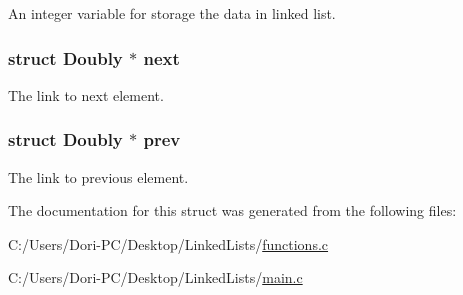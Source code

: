 An integer variable for storage the data in linked list. 

\subsubsection[{\texorpdfstring{next}{next}}]{\setlength{\rightskip}{0pt plus 5cm}struct {\bf Doubly} $\ast$ next}\hypertarget{struct_doubly_a446016a5717359a5bb6fd48bd6074689}{}\label{struct_doubly_a446016a5717359a5bb6fd48bd6074689}


The link to next element. 

\subsubsection[{\texorpdfstring{prev}{prev}}]{\setlength{\rightskip}{0pt plus 5cm}struct {\bf Doubly} $\ast$ prev}\hypertarget{struct_doubly_a64610e02fbdabdc7e7765ec91baaab18}{}\label{struct_doubly_a64610e02fbdabdc7e7765ec91baaab18}


The link to previous element. 



The documentation for this struct was generated from the following files\+:\begin{DoxyCompactItemize}
\item 
C\+:/\+Users/\+Dori-\/\+P\+C/\+Desktop/\+Linked\+Lists/\hyperlink{functions_8c}{functions.\+c}\item 
C\+:/\+Users/\+Dori-\/\+P\+C/\+Desktop/\+Linked\+Lists/\hyperlink{main_8c}{main.\+c}\end{DoxyCompactItemize}
